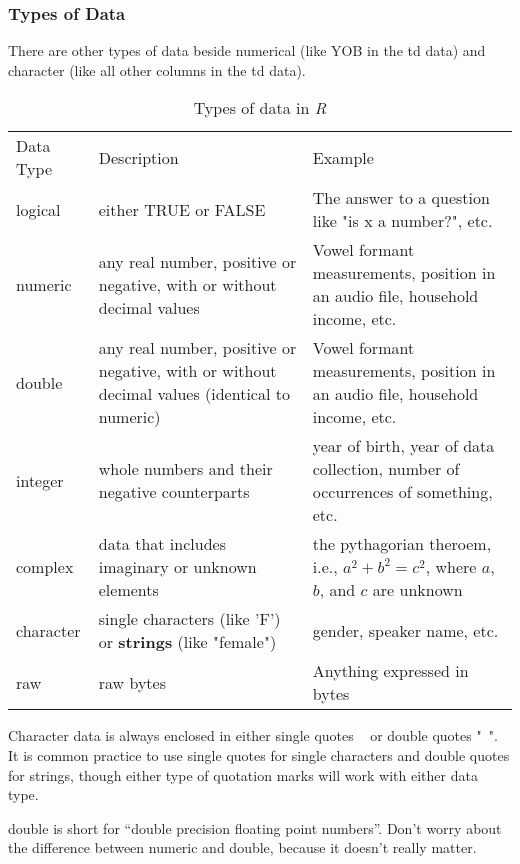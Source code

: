 \documentclass[
  10pt,
  letterpaper]{article}
\renewcommand\texttt[1]{{\ttfamily\color{BrickRed}#1}}
\begin{document}
\hypertarget{types-of-data}{%
\subsubsection{Types of Data}\label{types-of-data}}

There are other types of data beside \texttt{numerical} (like
\texttt{YOB} in the \texttt{td} data) and \texttt{character} (like all
other columns in the \texttt{td} data).

\begin{table}
\caption{Types of data in \textit{R}}
\begin{tabular}{lp{}p{}}
\toprule
 Data Type & Description & Example\\                                                                  \texttt{logical} & either \texttt{TRUE} or \texttt{FALSE} & The answer to a question like "is \texttt{x} a number?", etc.\\       
 \texttt{numeric} & any real number, positive or negative, with or without decimal values & Vowel formant measurements, position in an audio file, household income, etc.\\ 
\texttt{double}& any real number, positive or negative, with or without decimal values (identical to \texttt{numeric}) & Vowel formant measurements, position in an audio file, household income, etc.\\
\texttt{integer}& whole numbers and their negative counterparts & year of birth, year of data collection, number of occurrences of something, etc.\\
\texttt{complex} & data that includes imaginary or unknown elements & the pythagorian theroem, i.e., $a^2 + b^2 = c^2$, where $a$, $b$, and $c$ are unknown\\
\texttt{character} & single characters (like \texttt{'F'}) or \textbf{strings} (like \texttt{"female"}) & gender, speaker name, etc.\\ 
\texttt{raw} & raw bytes  & Anything expressed in bytes \\
\end{tabular}
\end{table}

\begin{tcolorbox}[enhanced jigsaw, rightrule=.15mm, titlerule=0mm, coltitle=black, opacityback=0, arc=.35mm, left=2mm, toprule=.15mm, title=\textcolor{quarto-callout-note-color}{\faInfo}\hspace{0.5em}{Note}, toptitle=1mm, colback=white, opacitybacktitle=0.6, colframe=quarto-callout-note-color-frame, breakable, colbacktitle=quarto-callout-note-color!10!white, bottomtitle=1mm, bottomrule=.15mm, leftrule=.75mm]
Character data is always enclosed in either single quotes
\texttt{\textquotesingle{}\ \textquotesingle{}} or double quotes
\texttt{"\ "}. It is common practice to use single quotes for single
characters and double quotes for strings, though either type of
quotation marks will work with either data type.

\texttt{double} is short for ``double precision floating point
numbers''. Don't worry about the difference between \texttt{numeric} and
\texttt{double}, because it doesn't really matter.
\end{tcolorbox}
\end{document}
